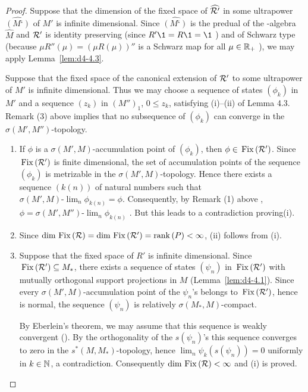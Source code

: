 \begin{proof}
Suppose that the dimension of the fixed space of $ \widehat{\mathcal{R}'} $  in some ultrapower $ \widehat{(M‘)} $  of $ M' $  is infinite dimensional.
Since $ \widehat{(M‘)} $ is the predual of the \WA-algebra $ \widehat{M} $  and $ \mathcal{R}' $  is identity preserving (since $ R'\1 = R\1 = \1 $ ) and of Schwarz type (because $ \mu R''(\mu) = (\mu R(\mu))'' $  is a Schwarz map for all $ \mu \in \mathbb{R}_{+} $ ), we may apply Lemma~\ref{lem:d4-4.3}.

Suppose that the fixed space of the canonical extension of $ \mathcal{R}' $  to some ultrapower of $ M' $  is infinite dimensional.
Thus we may choose a sequence of states $ (\phi_{k}) $  in $ M' $  and a sequence $ (z_{k}) $  in $ (M'')_{1}$, $ 0 \leq z_{k} $,  satisfying (i)--(ii) of Lemma 4.3.
Remark (3) above implies that no subsequence of $ (\phi_{k}) $  can converge in the $ \sigma(M',M'') $-topology.
\begin{enumerate}
\item
If $ \phi $  is a $ \sigma(M',M) $-accumulation point of $ (\phi_{k}) $, then $ \phi \in \mathop{}\mathrm{Fix}\left(\mathcal{R}'\right) $.
Since $ \mathop{}\mathrm{Fix}\left(\mathcal{R}'\right) $  is finite dimensional, the set of accumulation points of the sequence $ (\phi_{k}) $  is metrizable in the $ \sigma(M',M) $-topology.
Hence there exists a sequence $ (k(n)) $  of natural numbers such that $ \sigma(M',M)\text{-}\lim_{n} \phi_{k(n)} = \phi $.
Consequently, by Remark (1) above , $ \phi = \sigma(M',M'')\text{-}\lim_{n} \phi_{k(n)} $  .
But this leads to a contradiction proving(i).

\item
Since $ \dim \mathop{}\mathrm{Fix}\left(\mathcal{R}\right) = \dim \mathop{}\mathrm{Fix}\left(\mathcal{R}'\right) = \mathop{}\!\mathrm{rank}\,(P) < \infty $, (ii) follows from (i).

\item
Suppose that the fixed space of $ R' $  is infinite dimensional.
Since $ \mathop{}\mathrm{Fix}\left(\mathcal{R}'\right) \subseteq M_{*} $,  there exists a sequence of states $ (\psi_{n}) $  in $ \mathop{}\mathrm{Fix}\left(\mathcal{R}'\right) $  with mutually orthogonal support projections in $ M $  (Lemma~\ref{lem:d4-4.1}).
Since every $ \sigma(M',M) $-accumulation point of the $ \psi_{n} $'s belongs to $ \mathop{}\mathrm{Fix}\left(\mathcal{R}'\right) $, hence is normal, the sequence $ (\psi_{n}) $  is relatively $ \sigma(M_{*},M) $-compact.

By Eberlein's theorem, we may assume that this sequence is weakly convergent (\citet{schaefer:1966}).
By the orthogonality of the $ s(\psi_{n}) $'s this sequence converges to zero in the $ s^{*}(M,M_{*}) $-topology, hence $ \lim_{n} \psi_{k}(s(\psi_{n})) = 0 $  uniformly in $ k \in \mathbb{N} $, a contradiction.
Consequently $ \dim \mathop{}\mathrm{Fix}\left(\mathcal{R}\right) < \infty $  and (i) is proved.


\end{enumerate}
\end{proof}
